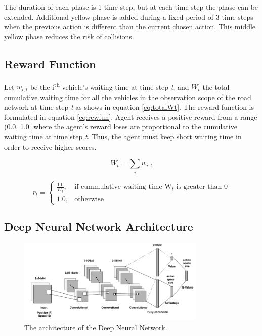 \documentclass{llncs}
\begin{document}
The duration of each phase is 1 time step, but at each time step the phase can be extended. Additional yellow phase is added during a fixed period of 3 time steps when the previous action is different than the current chosen action. This middle yellow phase reduces the risk of collisions.

\subsection{Reward Function}

Let $w_{i,t}$ be the i\textsuperscript{th} vehicle's waiting time at time step \textit{t}, and $W_{t}$ the total cumulative waiting time for all the vehicles in the observation scope of the road network at time step \textit{t} as shows in equation \ref{eq:totalWt}. The reward function is formulated in equation \ref{eq:rewfun}. Agent receives a positive reward from a range (0.0, 1.0] where the agent's reward loses are proportional to the cumulative waiting time at time step \textit{t}. Thus, the agent must keep short waiting time in order to receive higher scores.

\begin{equation} \label{eq:totalWt}
W_{t} = \sum_{i}w_{i,t}
\end{equation}

\begin{equation} \label{eq:rewfun}
r_{t} = \begin{cases}
    \frac{1.0}{W_{t}}, & \text{if cummulative waiting time W$_{t}$ is greater than 0}\\
    1.0, & \text{otherwise}
\end{cases}
\end{equation}

\subsection{Deep Neural Network Architecture}\label{DNNArch}

\begin{figure}[!htbp]
\begin{center}
  \includegraphics[width=0.8\textwidth]{images/CNN.png}
  \caption{The architecture of the Deep Neural Network.}
  \label{fig:CNN}
\end{center}
\end{figure}
\end{document}
